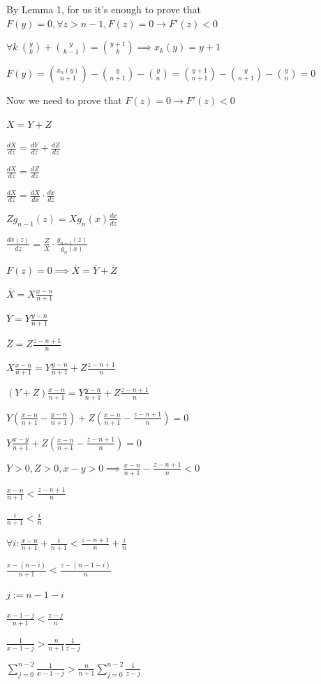 \documentclass{article}
\begin{document}
By Lemma 1, for us it's enough to prove that \( F(y) = 0, \forall z > n - 1, F(z) = 0 \rightarrow F'(z) < 0 \)

\( \forall k\ \binom{y}{k} + \binom{y}{k-1} = \binom{y+1}{k} \implies x_{k}(y) = y + 1 \)

\( F(y) = \binom{x_{n}(y)}{n + 1} - \binom{y}{n + 1} - \binom{y}{n} = \binom{y+1}{n + 1} - \binom{y}{n + 1} - \binom{y}{n} = 0 \)

Now we need to prove that \( F(z) = 0 \to F'(z) < 0 \)

\( X = Y + Z \)

\( \frac{dX}{dz} = \frac{dY}{dz} + \frac{dZ}{dz} \)

\( \frac{dX}{dz} = \frac{dZ}{dz} \)

\( \frac{dX}{dz} = \frac{dX}{dx} \cdot \frac{dx}{dz} \)

\( Z g_{n-1}(z) = X g_{n}(x) \frac{dx}{dz} \)

\( \frac{dx(z)}{dz} = \frac{Z}{X} \cdot \frac{g_{n-1}(z)}{g_{n}(x)} \)

\( F(z) = 0 \implies \bar{X} = \bar{Y} + \bar{Z} \)

\( \bar{X} = X \frac{x-n}{n+1} \)

\( \bar{Y} = Y \frac{y-n}{n+1} \)

\( \bar{Z} = Z \frac{z-n+1}{n} \)

\( X \frac{x-n}{n+1} = Y \frac{y-n}{n+1} + Z \frac{z-n+1}{n} \)

\( (Y + Z) \frac{x-n}{n+1} = Y \frac{y-n}{n+1} + Z \frac{z-n+1}{n} \)

\( Y(\frac{x-n}{n+1} - \frac{y-n}{n+1}) + Z(\frac{x-n}{n+1} - \frac{z-n+1}{n}) = 0 \)

\( Y \frac{x-y}{n+1} + Z(\frac{x-n}{n+1} - \frac{z-n+1}{n}) = 0 \)

\( Y > 0, Z > 0, x - y > 0 \implies \frac{x-n}{n+1} - \frac{z-n+1}{n} < 0 \)

\( \frac{x-n}{n+1} < \frac{z-n+1}{n} \)

\( \frac{i}{n+1} < \frac{i}{n} \)

\( \forall i: \frac{x-n}{n+1} + \frac{i}{n+1} < \frac{z-n+1}{n} + \frac{i}{n} \)

\( \frac{x-(n-i)}{n+1} < \frac{z-(n-1-i)}{n} \)

\( j := n - 1 - i \)

\( \frac{x-1-j}{n+1} < \frac{z-j}{n} \)

\( \frac{1}{x-1-j} > \frac{n}{n+1}\frac{1}{z-j} \)

\( \sum_{j=0}^{n-2}\frac{1}{x-1-j} > \frac{n}{n+1}\sum_{j=0}^{n-2}\frac{1}{z-j} \)
\end{document}
